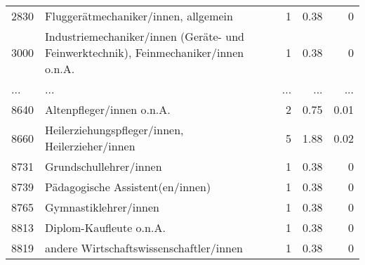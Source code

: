 \begin{longtable}{lXrrr}
        2830 & \multicolumn{1}{X}{Fluggerätmechaniker/innen, allgemein} & %
          \num{1} &
          \num[round-mode=places,round-precision=2]{0.38} &
          \num[round-mode=places,round-precision=2]{0} \\
        3000 & \multicolumn{1}{X}{Industriemechaniker/innen (Geräte- und Feinwerktechnik), Feinmechaniker/innen o.n.A.} & %
          \num{1} &
          \num[round-mode=places,round-precision=2]{0.38} &
          \num[round-mode=places,round-precision=2]{0} \\
       ... & ... & ... & ... & ... \\
        8640 & \multicolumn{1}{X}{Altenpfleger/innen o.n.A.} & %
          \num{2} &
          \num[round-mode=places,round-precision=2]{0.75} &
          \num[round-mode=places,round-precision=2]{0.01} \\

        8660 & \multicolumn{1}{X}{Heilerziehungspfleger/innen, Heilerzieher/innen} & %
          \num{5} &
          \num[round-mode=places,round-precision=2]{1.88} &
          \num[round-mode=places,round-precision=2]{0.02} \\

        8731 & \multicolumn{1}{X}{Grundschullehrer/innen} & %
          \num{1} &
          \num[round-mode=places,round-precision=2]{0.38} &
          \num[round-mode=places,round-precision=2]{0} \\

        8739 & \multicolumn{1}{X}{Pädagogische Assistent(en/innen)} & %
          \num{1} &
          \num[round-mode=places,round-precision=2]{0.38} &
          \num[round-mode=places,round-precision=2]{0} \\

        8765 & \multicolumn{1}{X}{Gymnastiklehrer/innen} & %
          \num{1} &
          \num[round-mode=places,round-precision=2]{0.38} &
          \num[round-mode=places,round-precision=2]{0} \\

        8813 & \multicolumn{1}{X}{Diplom-Kaufleute o.n.A.} & %
          \num{1} &
          \num[round-mode=places,round-precision=2]{0.38} &
          \num[round-mode=places,round-precision=2]{0} \\

        8819 & \multicolumn{1}{X}{andere Wirtschaftswissenschaftler/innen} & %
          \num{1} &
          \num[round-mode=places,round-precision=2]{0.38} &
          \num[round-mode=places,round-precision=2]{0} \\


\end{longtable}
